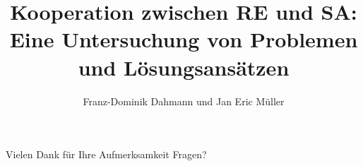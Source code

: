 \documentclass[11pt]{beamer}
\author[]{Franz-Dominik Dahmann und Jan Eric M\"uller}
\title[Kooperation zwischen RE und SA]{Kooperation zwischen RE und SA: \\Eine Untersuchung von Problemen und L\"osungsans\"atzen}
\institute{Hochschule Bonn-Rhein-Sieg}
\begin{document}
\begin{frame}
\titlepage
\end{frame}

\begin{frame}
\tableofcontents
\end{frame}






\begin{frame}{Vielen Dank für Ihre Aufmerksamkeit }
Fragen?
\end{frame}
\end{document}
